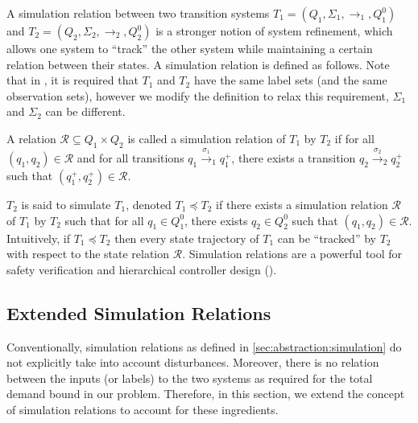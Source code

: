 A simulation relation between two transition systems $T_1 = (Q_1, \Sigma_1,
\rightarrow_1, Q^0_1)$ and $T_2 = (Q_2, \Sigma_2, \rightarrow_2, Q^0_2)$ is a
stronger notion of system refinement, which allows one system to ``track'' the
other system while maintaining a certain relation between their states. A
simulation relation is defined as follows. Note that in
{\cite{girardetal07amd}}, it is required that $T_1$ and $T_2$ have the same
label sets (and the same observation sets), however we modify the definition
to relax this requirement, {\ie} $\Sigma_1$ and $\Sigma_2$ can be different.

\begin{definition}[Simulation]
  \label{def:simulation-relation}A relation $\mathcal{R} \subseteq Q_1 \times
  Q_2$ is called a simulation relation of $T_1$ by $T_2$ if for all $(q_1,
  q_2) \in \mathcal{R}$ and for all transitions $q_1 \xrightarrow{\sigma_1}_{1}
  q^+_1$, there exists a transition $q_2 \xrightarrow{\sigma_2}_{2}
  q^+_2$ such that $(q_1^+, q_2^+) \in \mathcal{R}$.
\end{definition}

$T_2$ is said to simulate $T_1$, denoted $T_1 \preceq T_2$ if there exists a
simulation relation $\mathcal{R}$ of $T_1$ by $T_2$ such that for all $q_1 \in
Q^0_1$, there exists $q_2 \in Q^0_2$ such that $(q_1, q_2) \in \mathcal{R}$.
Intuitively, if $T_1 \preceq T_2$ then every state trajectory of $T_1$ can be
``tracked'' by $T_2$ with respect to the state relation $\mathcal{R}$.
Simulation relations are a powerful tool for safety verification and
hierarchical controller design ().

\subsection{Extended Simulation Relations}
\label{sec:abstraction:ext-simulation}

Conventionally, simulation relations as defined in \cref{sec:abstraction:simulation} do not explicitly take into account %
disturbances.  Moreover, there is no relation between the inputs (or labels) to the two systems as required for the total demand bound in our problem.  Therefore, in this section, we extend the concept of simulation relations to account for these ingredients.

